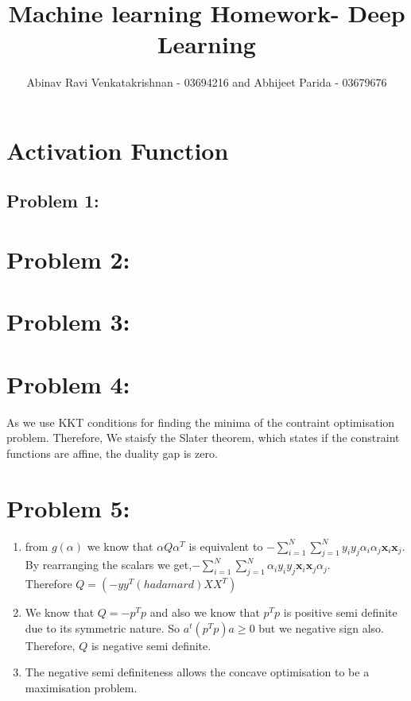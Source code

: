 \documentclass[5pt,a4paper]{article}
\begin{document}
	\title{Machine learning Homework- Deep Learning }
	\author{Abinav Ravi Venkatakrishnan - 03694216 and Abhijeet Parida - 03679676}
	\maketitle
	\section{Activation Function}
	\subsection*{Problem 1:}
	
	
	\section*{Problem 2:}
	
	
	\section*{Problem 3:}
	
	
	\section*{Problem 4:}
	As we use KKT conditions for finding the minima of the contraint optimisation problem. Therefore, We staisfy the Slater theorem, which states  if the constraint 	functions are affine, the duality gap is zero.
	\section*{Problem 5:}
	\begin{enumerate}
		\item from $g(\alpha)$ we know that $\alpha Q\alpha^T$ is equivalent to $-\sum_{i=1}^{N}\sum_{j=1}^{N} y_i y_j \alpha_i \alpha_j \textbf{x}_i \textbf{x}_j$. By rearranging the scalars we get,$-\sum_{i=1}^{N}\sum_{j=1}^{N}\alpha_i  y_i y_j  \textbf{x}_i \textbf{x}_j \alpha_j$. \\Therefore $Q= (-yy^T(hadamard)XX^T)$		\item We know that $Q=-p^Tp$ and also we know that $p^Tp$ is positive semi definite due to its symmetric nature. So $a^t (p^Tp)a \geq 0$ but we negative sign also. Therefore, $Q$ is negative semi definite.
		\item The negative semi definiteness allows the concave optimisation to be a maximisation problem. 
	\end{enumerate}
	
\end{document}
